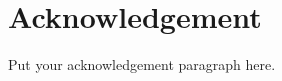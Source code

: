 \chapter*{Acknowledgement}
\label{chap:acknowledgement}

Put your acknowledgement paragraph here.

\vspace{.2in}
\begin{flushright}
    \usevar{\srsAuthorOne} \\
    \usevar{\srsAuthorTwo}
\end{flushright}
